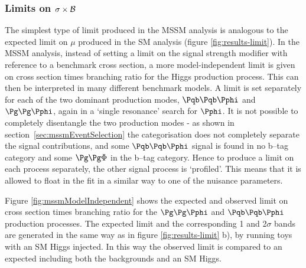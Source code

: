 \subsubsection{Limits on $\sigma \times \cal{B}$}

The simplest type of limit produced in the \ac{MSSM} analysis is analogous to the 
expected limit on $\mu$ produced in the \ac{SM} analysis (figure
\ref{fig:results-limit}). In the \ac{MSSM} analysis, instead of setting a limit
on the signal strength modifier with reference to a benchmark cross section, a
more model-independent limit is given on cross section times branching ratio
for the Higgs production process. This can then be interpreted in many different
benchmark models. A limit is set separately for each of the two dominant production modes,
$\Pqb\Pqb\Pphi$ and $\Pg\Pg\Pphi$, again in a `single
resonance' search for $\Pphi$. It is not possible to
completely disentangle the two production modes - as shown in
section~\ref{sec:mssmEventSelection} the categorisation does not completely
separate the signal contributions, and some $\Pqb\Pqb\Pphi$ signal is
found in no b--tag category and some $\Pg\Pg\Phi$ in the b--tag category. Hence
to produce a limit on each process separately, the other signal process is
`profiled'. This means that it is allowed to float in the fit in a similar way
to one of the nuisance parameters. 

Figure \ref{fig:mssmModelIndependent} shows the expected and observed limit on
cross section times branching ratio for the $\Pg\Pg\Pphi$ and $\Pqb\Pqb\Pphi$
production processes. The expected limit and the corresponding 1 and 2$\sigma$ bands
are generated in the same way as in figure \ref{fig:results-limit} b), by
running toys with an \ac{SM} Higgs injected.
In this way the observed limit is compared to an expected including both the
backgrounds and an \ac{SM} Higgs. 

